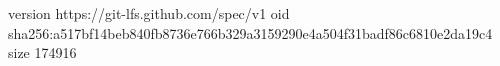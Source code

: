 version https://git-lfs.github.com/spec/v1
oid sha256:a517bf14beb840fb8736e766b329a3159290e4a504f31badf86c6810e2da19c4
size 174916

